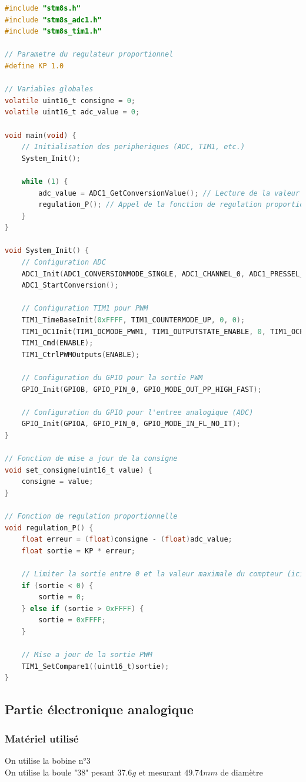 \documentclass[11pt,a4paper]{article}
\begin{document}
\pagebreak
\begin{lstlisting}[language = C]
#include "stm8s.h"
#include "stm8s_adc1.h"
#include "stm8s_tim1.h"

// Parametre du regulateur proportionnel
#define KP 1.0

// Variables globales
volatile uint16_t consigne = 0;
volatile uint16_t adc_value = 0;

void main(void) {
    // Initialisation des peripheriques (ADC, TIM1, etc.)
    System_Init();

    while (1) {
        adc_value = ADC1_GetConversionValue(); // Lecture de la valeur ADC
        regulation_P(); // Appel de la fonction de regulation proportionnelle
    }
}

void System_Init() {
    // Configuration ADC
    ADC1_Init(ADC1_CONVERSIONMODE_SINGLE, ADC1_CHANNEL_0, ADC1_PRESSEL_FCPU_D2, ADC1_EXTTRIG_TIM, DISABLE, ADC1_ALIGN_RIGHT, ADC1_SCHMITTTRIG_CHANNEL0, DISABLE);
    ADC1_StartConversion();

    // Configuration TIM1 pour PWM
    TIM1_TimeBaseInit(0xFFFF, TIM1_COUNTERMODE_UP, 0, 0);
    TIM1_OC1Init(TIM1_OCMODE_PWM1, TIM1_OUTPUTSTATE_ENABLE, 0, TIM1_OCPOLARITY_HIGH);
    TIM1_Cmd(ENABLE);
    TIM1_CtrlPWMOutputs(ENABLE);

    // Configuration du GPIO pour la sortie PWM
    GPIO_Init(GPIOB, GPIO_PIN_0, GPIO_MODE_OUT_PP_HIGH_FAST);

    // Configuration du GPIO pour l'entree analogique (ADC)
    GPIO_Init(GPIOA, GPIO_PIN_0, GPIO_MODE_IN_FL_NO_IT);
}

// Fonction de mise a jour de la consigne
void set_consigne(uint16_t value) {
    consigne = value;
}

// Fonction de regulation proportionnelle
void regulation_P() {
    float erreur = (float)consigne - (float)adc_value;
    float sortie = KP * erreur;

    // Limiter la sortie entre 0 et la valeur maximale du compteur (ici 0xFFFF)
    if (sortie < 0) {
        sortie = 0;
    } else if (sortie > 0xFFFF) {
        sortie = 0xFFFF;
    }

    // Mise a jour de la sortie PWM
    TIM1_SetCompare1((uint16_t)sortie);
}
\end{lstlisting}

\subsection{Partie électronique analogique}
\subsubsection{Matériel utilisé}
On utilise la bobine n°3\\
On utilise la boule "38" pesant $37.6g$ et mesurant $49.74mm$ de diamètre
\end{document}

